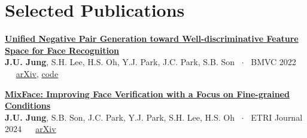 \documentclass[a4paper,10pt]{article}
\begin{document}
\section{Selected Publications}
\textbf{\href{https://arxiv.org/abs/2203.11593}{Unified Negative Pair Generation toward Well-discriminative Feature Space for Face Recognition}}\\
{\color{muted}\small \textbf{J.U. Jung}, S.H. Lee, H.S. Oh, Y.J. Park, J.C. Park, S.B. Son ~$\cdot$~ BMVC 2022 ~\textbar~
\href{https://arxiv.org/abs/2203.11593}{arXiv}, \href{https://github.com/junuke/UNPG}{code}}\par\vspace{3pt}
\textbf{\href{https://onlinelibrary.wiley.com/doi/full/10.4218/etrij.2023-0167}{MixFace: Improving Face Verification with a Focus on Fine-grained Conditions}}\\
{\color{muted}\small \textbf{J.U. Jung}, S.B. Son, J.C. Park, Y.J. Park, S.H. Lee, H.S. Oh ~$\cdot$~ ETRI Journal 2024 ~\textbar~
\href{https://arxiv.org/abs/2111.01717}{arXiv}}

\end{document}
